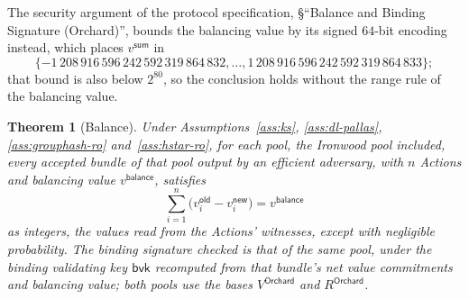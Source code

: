 \documentclass[11pt,a4paper]{article}
\newtheorem{theorem}{Theorem}[section]
\theoremstyle{definition}
\begin{document}
The security argument of the protocol specification, \S``Balance and
Binding Signature (Orchard)'', bounds the balancing value by its signed
$64$-bit encoding instead, which places $v^{\mathsf{sum}}$ in
\[
  \{-1\,208\,916\,596\,242\,592\,319\,864\,832, \dots,
    1\,208\,916\,596\,242\,592\,319\,864\,833\};
\]
that bound is also below $2^{80}$, so the conclusion holds without the range
rule of the balancing value.

\begin{theorem}[Balance]\label{thm:balance}
Under Assumptions~\ref{ass:ks}, \ref{ass:dl-pallas},
\ref{ass:grouphash-ro} and~\ref{ass:hstar-ro}, for each pool, the Ironwood
pool included, every accepted bundle of that pool output by an efficient
adversary, with $n$ Actions and balancing value $v^{\mathsf{balance}}$,
satisfies
\[
  \sum_{i=1}^{n} \bigl(v^{\mathsf{old}}_i - v^{\mathsf{new}}_i\bigr)
    = v^{\mathsf{balance}}
\]
as integers, the values read from the Actions' witnesses, except with
negligible probability. The binding signature checked is that of the same
pool, under the binding validating key $\mathsf{bvk}$ recomputed from that
bundle's net value commitments and balancing value; both pools use the bases
$V^{\mathsf{Orchard}}$ and $R^{\mathsf{Orchard}}$.
\end{theorem}
\end{document}
